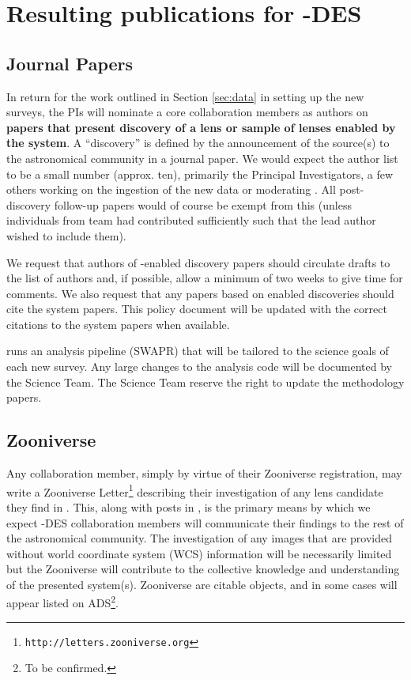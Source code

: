 \documentclass[a4paper,twocolumn]{article}
\begin{document}

\section{Resulting publications for \SW-DES }
\label{sec:series}

\subsection{Journal Papers}
\label{sec:papers}
In return for the work outlined in Section \ref{sec:data} in setting up the new surveys, the \SW PIs will nominate a core \SW collaboration members as authors on \textbf{papers that
present discovery of a lens or sample of lenses enabled by the \SW system}. A ``discovery'' is defined by the announcement of the source(s) to the astronomical community in a journal paper. We would expect the \SW author list to be a small number (approx. ten), primarily the Principal Investigators, a few others working on the ingestion of the new data or moderating \Talk. All post-discovery follow-up papers would of course be exempt from this (unless individuals from \sw team had contributed sufficiently such that the lead author wished to include them). 

We request that authors of \SW-enabled discovery papers should circulate drafts to the list of \SW authors and, if possible, allow a minimum of two weeks to give time for comments. We also request that any papers based on \SW enabled discoveries should cite the \SW system papers. This policy document will be updated with the correct citations to the \SW system papers when available.

\SW runs an analysis pipeline (SWAPR) that will be tailored to the science goals of each new survey. Any large changes to the analysis code will be documented  by the \SW Science Team. The \SW Science Team reserve the right to update the \SW methodology papers.



\subsection{Zooniverse \Letters}
\label{sec:comm}

Any \SW collaboration member, simply by virtue of their Zooniverse
registration, may write a Zooniverse
Letter\footnote{\texttt{http://letters.zooniverse.org}} describing their
investigation of any lens candidate they find in \SW. This, along with
posts in  \Talk, is the primary means by which we expect \SW-DES collaboration
members will communicate their findings to the rest of the
astronomical community. The investigation of any \SW images that are
provided without world coordinate system (WCS) information will be
necessarily limited but the \SW Zooniverse \Letters will contribute to the collective knowledge and understanding of the presented system(s). Zooniverse \Letters are citable\SW
objects, and in some cases will appear listed on ADS\footnote{To be confirmed.}. 
\end{document}
